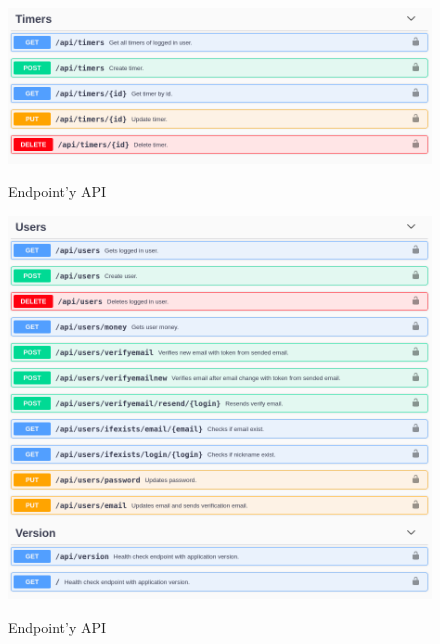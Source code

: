 \documentclass[a4paper,11pt]{report}
\begin{document}
\begin{figure}[H]
	\centering
	\includegraphics[scale=0.5]{implementacja/backend/timers_api}\\
	\caption{Endpoint'y API}
	\label{fig:timers_api}
\end{figure}
\begin{figure}[H]
	\centering
	\includegraphics[scale=0.5]{implementacja/backend/users_api}\\
	\caption{Endpoint'y API}
	\label{fig:users_api}
\end{figure}
\end{document}
